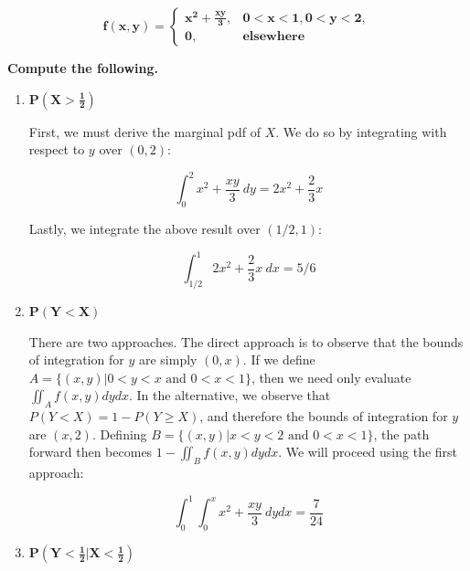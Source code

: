 \documentclass[10pt, oneside]{article}
\begin{document}
\begin{enumerate}[label=6.\arabic*]
\begin{tcolorbox}[
  colback=Cerulean!5!white,
  colframe=Cerulean!75!black]
\[ \bm{f(x,y) = } \begin{cases} \bm{x^2 + \frac{xy}{3},} & \bm{0 < x < 1, 0 < y < 2,} \\
\bm{0}, & \textbf{elsewhere}
\end{cases} \]

\textbf{Compute the following.}
\end{tcolorbox}

	\begin{enumerate}
	\item  \begin{tcolorbox}[
	  colback=Cerulean!5!white,
	  colframe=Cerulean!75!black]
	\textbf{$\bm{ P(X > \frac{1}{2} ) } $ }
	\end{tcolorbox}
	
	First, we must derive the marginal pdf of $X$. We do so by integrating with respect to $y$ over $(0, 2)$:
	
	\[ \int^2_0 x^2 + \frac{xy}{3} \ dy = 2x^2 + \frac{2}{3} x \]
	
	Lastly, we integrate the above result over $(1/2, 1)$:
	
	\[ \int^1_{1/2} 2x^2 + \frac{2}{3} x \ dx = \boxed{5/6} \]
	
	\item  \begin{tcolorbox}[
	  colback=Cerulean!5!white,
	  colframe=Cerulean!75!black]
	\textbf{$\bm{ P(Y < X ) } $ }
	\end{tcolorbox}
	
	There are two approaches. The direct approach is to observe that the bounds of integration for $y$ are simply $(0, x)$. If we define $A = \{ (x, y) | 0 < y < x \text{ and } 0 < x < 1 \}$, then we need only evaluate $\iint_A f(x, y) dy dx$. In the alternative, we observe that $P(Y < X) = 1 - P(Y \geq X)$, and therefore the bounds of integration for $y$ are $(x, 2)$. Defining $B = \{ (x,y) | x < y < 2 \text{ and } 0 < x < 1 \}$, the path forward then becomes $1 - \iint_B f(x,y) dy dx$. We will proceed using the first approach:
	
	\[ \int^1_0 \int^x_0 x^2 + \frac{xy}{3} \ dy dx = \boxed{ \frac{7}{24} } \]
	
	\item  \begin{tcolorbox}[
	  colback=Cerulean!5!white,
	  colframe=Cerulean!75!black]
	\textbf{$\bm{ P(Y < \frac{1}{2} | X < \frac{1}{2} ) } $ }
	\end{tcolorbox}
	

\end{enumerate}
\end{enumerate}
\end{document}
